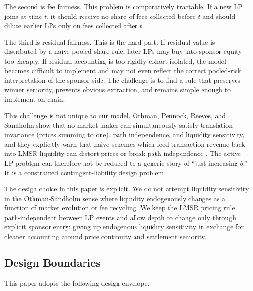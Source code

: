 \documentclass[10pt]{article}
\begin{document}
The second is fee fairness. This problem is comparatively tractable. If a new LP joins at time $t$, it should receive no share of fees collected before $t$ and should dilute earlier LPs only on fees collected after $t$.

The third is residual fairness. This is the hard part. If residual value is distributed by a naive pooled-share rule, later LPs may buy into sponsor equity too cheaply. If residual accounting is too rigidly cohort-isolated, the model becomes difficult to implement and may not even reflect the correct pooled-risk interpretation of the sponsor side. The challenge is to find a rule that preserves winner seniority, prevents obvious extraction, and remains simple enough to implement on-chain.

This challenge is not unique to our model. Othman, Pennock, Reeves, and Sandholm show that no market maker can simultaneously satisfy translation invariance (prices summing to one), path independence, and liquidity sensitivity, and they explicitly warn that naive schemes which feed transaction revenue back into LMSR liquidity can distort prices or break path independence \cite{othmansandholm2010}. The active-LP problem can therefore not be reduced to a generic story of ``just increasing $b$.'' It is a constrained contingent-liability design problem.

The design choice in this paper is explicit. We do not attempt liquidity sensitivity in the Othman-Sandholm sense where liquidity endogenously changes as a function of market evolution or fee recycling. We keep the LMSR pricing rule path-independent between LP events and allow depth to change only through explicit sponsor entry: giving up endogenous liquidity sensitivity in exchange for cleaner accounting around price continuity and settlement seniority.

\subsection{Design Boundaries}

This paper adopts the following design envelope.
\end{document}
